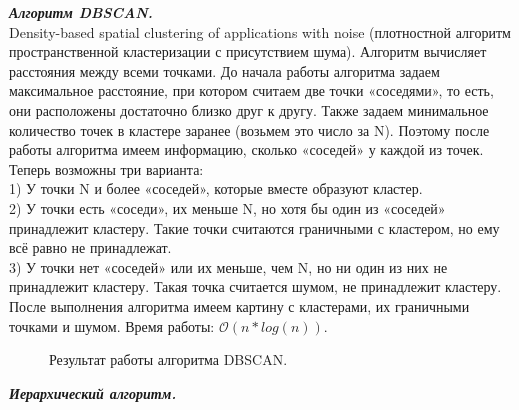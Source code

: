 \documentclass[12pt, a4paper]{article}
\begin{document}
\textit{\textbf{Алгоритм DBSCAN.}}\\Density-based spatial clustering of applications with noise (плотностной алгоритм пространственной кластеризации с присутствием шума). Алгоритм вычисляет расстояния между всеми точками. До начала работы алгоритма задаем максимальное расстояние, при котором считаем две точки «соседями», то есть, они расположены достаточно близко друг к другу. Также задаем минимальное количество точек в кластере заранее (возьмем это число за N). Поэтому после работы алгоритма имеем информацию, сколько «соседей» у каждой из точек. Теперь возможны три варианта:\\1) У точки N и более «соседей», которые вместе образуют кластер.\\2) У точки есть «соседи», их меньше N, но хотя бы один из «соседей» принадлежит кластеру. Такие точки считаются граничными с кластером, но ему всё равно не принадлежат.\\3) У точки нет «соседей» или их меньше, чем N, но ни один из них не принадлежит кластеру. Такая точка считается шумом, не принадлежит кластеру.\\После выполнения алгоритма имеем картину с кластерами, их граничными точками и шумом. Время работы: $\mathcal{O}(n*log(n)).$
\begin{figure}[h!]
\caption{Результат работы алгоритма DBSCAN.}
\label{fig:dbscan}
\end{figure}
\medskip 
 \medskip 
  \medskip 
   \medskip 
   
\textit{\textbf{Иерархический алгоритм.}}
\end{document}
